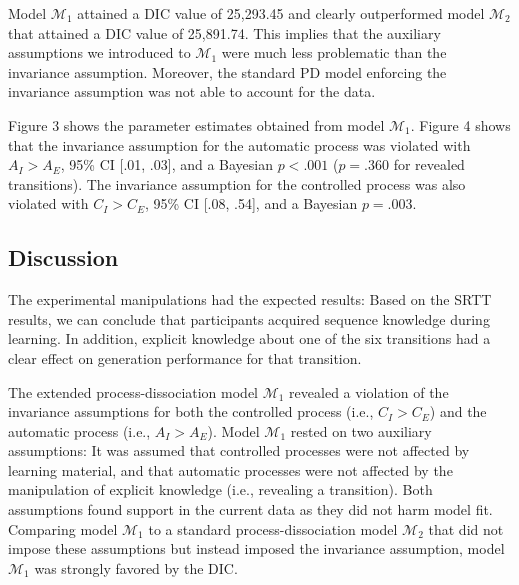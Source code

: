 \documentclass[floatsintext,man]{apa6}
\begin{document}
Model \(\mathcal{M}_1\) attained a DIC value of 25,293.45 and clearly
outperformed model \(\mathcal{M}_2\) that attained a DIC value of
25,891.74. This implies that the auxiliary assumptions we introduced to
\(\mathcal{M}_1\) were much less problematic than the invariance
assumption. Moreover, the standard PD model enforcing the invariance
assumption was not able to account for the data.



Figure 3 shows the parameter estimates obtained from model
\(\mathcal{M}_1\). Figure 4 shows that the invariance assumption for the
automatic process was violated with \(A_I > A_E\), 95\% CI {[}.01,
.03{]}, and a Bayesian \(p < .001\) (\(p = .360\) for revealed
transitions). The invariance assumption for the controlled process was
also violated with \(C_I > C_E\), 95\% CI {[}.08, .54{]}, and a Bayesian
\(p = .003\).

\subsection{Discussion}\label{discussion}

The experimental manipulations had the expected results: Based on the
SRTT results, we can conclude that participants acquired sequence
knowledge during learning. In addition, explicit knowledge about one of
the six transitions had a clear effect on generation performance for
that transition.

The extended process-dissociation model \(\mathcal{M}_1\) revealed a
violation of the invariance assumptions for both the controlled process
(i.e., \(C_I > C_E\)) and the automatic process (i.e., \(A_I > A_E\)).
Model \(\mathcal{M}_1\) rested on two auxiliary assumptions: It was
assumed that controlled processes were not affected by learning
material, and that automatic processes were not affected by the
manipulation of explicit knowledge (i.e., revealing a transition). Both
assumptions found support in the current data as they did not harm model
fit. Comparing model \(\mathcal{M}_1\) to a standard
process-dissociation model \(\mathcal{M}_2\) that did not impose these
assumptions but instead imposed the invariance assumption, model
\(\mathcal{M}_1\) was strongly favored by the DIC.
\end{document}
